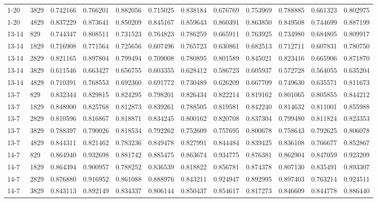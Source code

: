 \begin{longtable}{llrrrrrrrrrr}
1-20 & 3829 & 0.742166 & 0.766201 & 0.882056 & 0.715025 & 0.838184 & 0.676769 & 0.753969 & 0.788885 & 0.661323 & 0.802975\\
1-20 & 4829 & 0.837229 & 0.873641 & 0.850209 & 0.845167 & 0.859643 & 0.860391 & 0.863850 & 0.849508 & 0.744699 & 0.887199\\
13-14 & 829 & 0.744347 & 0.808511 & 0.731523 & 0.764823 & 0.786259 & 0.665911 & 0.763925 & 0.734980 & 0.684805 & 0.809917\\
13-14 & 1829 & 0.716908 & 0.771564 & 0.725656 & 0.607496 & 0.765723 & 0.630861 & 0.682513 & 0.712711 & 0.607831 & 0.780750\\
13-14 & 2829 & 0.821165 & 0.897804 & 0.799494 & 0.709008 & 0.780895 & 0.801589 & 0.845021 & 0.823416 & 0.665906 & 0.871870\\
13-14 & 3829 & 0.611546 & 0.663427 & 0.656755 & 0.603355 & 0.628412 & 0.586723 & 0.605937 & 0.572728 & 0.564055 & 0.635204\\
13-14 & 4829 & 0.710391 & 0.768553 & 0.692360 & 0.691772 & 0.730489 & 0.626209 & 0.667709 & 0.749630 & 0.635571 & 0.811673\\
13-7 & 829 & 0.832344 & 0.829815 & 0.824295 & 0.798201 & 0.826434 & 0.822214 & 0.819162 & 0.801065 & 0.805855 & 0.844212\\
13-7 & 1829 & 0.848900 & 0.825768 & 0.812873 & 0.839261 & 0.788505 & 0.819581 & 0.842240 & 0.814632 & 0.811001 & 0.855988\\
13-7 & 2829 & 0.810596 & 0.816867 & 0.818871 & 0.834245 & 0.800162 & 0.820708 & 0.837304 & 0.799480 & 0.811824 & 0.823353\\
13-7 & 3829 & 0.788397 & 0.790026 & 0.818534 & 0.792262 & 0.752609 & 0.757695 & 0.800678 & 0.758643 & 0.792625 & 0.806078\\
13-7 & 4829 & 0.844311 & 0.821462 & 0.783236 & 0.849478 & 0.827991 & 0.844484 & 0.839425 & 0.836108 & 0.766677 & 0.852867\\
14-7 & 829 & 0.864940 & 0.932698 & 0.881742 & 0.885475 & 0.863674 & 0.934775 & 0.876381 & 0.862904 & 0.847059 & 0.923209\\
14-7 & 1829 & 0.864394 & 0.900957 & 0.788252 & 0.836539 & 0.818822 & 0.856781 & 0.874378 & 0.807130 & 0.835491 & 0.893307\\
14-7 & 2829 & 0.876880 & 0.916952 & 0.861088 & 0.888976 & 0.843211 & 0.924947 & 0.892995 & 0.897403 & 0.763214 & 0.924511\\
14-7 & 3829 & 0.843113 & 0.892149 & 0.834337 & 0.806144 & 0.850437 & 0.854617 & 0.817273 & 0.846609 & 0.844778 & 0.886440\\

\end{longtable}
